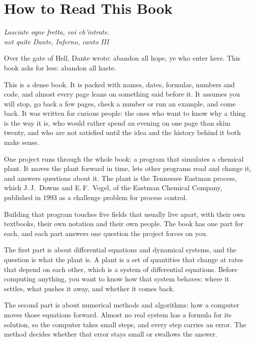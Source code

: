 \chapter*{How to Read This Book}

\begin{flushright}
\itshape Lasciate ogne fretta, voi ch'intrate.\\[2pt]
\upshape\small not quite Dante, \emph{Inferno}, canto III
\end{flushright}

Over the gate of Hell, Dante wrote: abandon all hope, ye who enter here. This
book asks for less: abandon all haste.

This is a dense book. It is packed with names, dates, formulas, numbers and
code, and almost every page leans on something said before it. It assumes you
will stop, go back a few pages, check a number or run an example, and come
back. It was written for curious people: the ones who want to know why a thing
is the way it is, who would rather spend an evening on one page than skim
twenty, and who are not satisfied until the idea and the history behind it both
make sense.

One project runs through the whole book: a program that simulates a chemical
plant. It moves the plant forward in time, lets other programs read and change
it, and answers questions about it. The plant is the Tennessee Eastman process,
which J.\,J.~Downs and E.\,F.~Vogel, of the Eastman Chemical Company, published
in 1993 as a challenge problem for process control.

Building that program touches five fields that usually live apart, with their
own textbooks, their own notation and their own people. The book has one part
for each, and each part answers one question the project forces on you.

The first part is about differential equations and dynamical systems, and the
question is what the plant is. A plant is a set of quantities that change at
rates that depend on each other, which is a system of differential equations.
Before computing anything, you want to know how that system behaves: where it
settles, what pushes it away, and whether it comes back.

The second part is about numerical methods and algorithms: how a computer moves
those equations forward. Almost no real system has a formula for its solution,
so the computer takes small steps, and every step carries an error. The method
decides whether that error stays small or swallows the answer.


